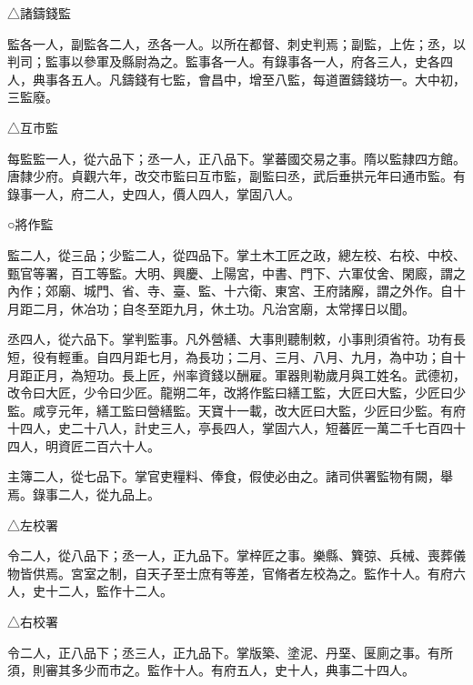 \begin{pinyinscope}
 △諸鑄錢監



 監各一人，副監各二人，丞各一人。以所在都督、刺史判焉；副監，上佐；丞，以判司；監事以參軍及縣尉為之。監事各一人。有錄事各一人，府各三人，史各四人，典事各五人。凡鑄錢有七監，會昌中，增至八監，每道置鑄錢坊一。大中初，三監廢。



 △互市監



 每監監一人，從六品下；丞一人，正八品下。掌蕃國交易之事。隋以監隸四方館。唐隸少府。貞觀六年，改交市監曰互市監，副監曰丞，武后垂拱元年曰通市監。有錄事一人，府二人，史四人，價人四人，掌固八人。



 ○將作監



 監二人，從三品；少監二人，從四品下。掌土木工匠之政，總左校、右校、中校、甄官等署，百工等監。大明、興慶、上陽宮，中書、門下、六軍仗舍、閑廄，謂之內作；郊廟、城門、省、寺、臺、監、十六衛、東宮、王府諸廨，謂之外作。自十月距二月，休冶功；自冬至距九月，休土功。凡治宮廟，太常擇日以聞。



 丞四人，從六品下。掌判監事。凡外營繕、大事則聽制敕，小事則須省符。功有長短，役有輕重。自四月距七月，為長功；二月、三月、八月、九月，為中功；自十月距正月，為短功。長上匠，州率資錢以酬雇。軍器則勒歲月與工姓名。武德初，改令曰大匠，少令曰少匠。龍朔二年，改將作監曰繕工監，大匠曰大監，少匠曰少監。咸亨元年，繕工監曰營繕監。天寶十一載，改大匠曰大監，少匠曰少監。有府十四人，史二十八人，計史三人，亭長四人，掌固六人，短蕃匠一萬二千七百四十四人，明資匠二百六十人。



 主簿二人，從七品下。掌官吏糧料、俸食，假使必由之。諸司供署監物有闕，舉焉。錄事二人，從九品上。



 △左校署



 令二人，從八品下；丞一人，正九品下。掌梓匠之事。樂縣、簨弶、兵械、喪葬儀物皆供焉。宮室之制，自天子至士庶有等差，官脩者左校為之。監作十人。有府六人，史十二人，監作十二人。



 △右校署



 令二人，正八品下；丞三人，正九品下。掌版築、塗泥、丹堊、匽廁之事。有所須，則審其多少而市之。監作十人。有府五人，史十人，典事二十四人。




\end{pinyinscope}
